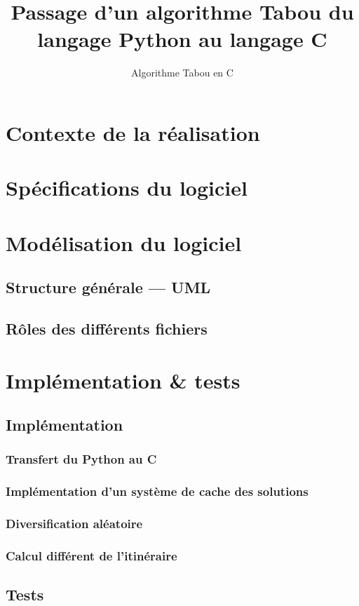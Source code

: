 \documentclass[hideweeklyreports]{polytech/polytech}
\title{Passage d'un algorithme Tabou du langage Python au langage C}
\subtitle{Algorithme Tabou en C}
\begin{document}
	\chapter{Contexte de la réalisation}
		
	\chapter{Spécifications du logiciel}
		
	\chapter{Modélisation du logiciel}
		\section{Structure générale — UML} %
		\section{Rôles des différents fichiers} %
		
	\chapter{Implémentation \& tests} %
		\section{Implémentation} %
			\subsection{Transfert du Python au C} %
			\subsection{Implémentation d'un système de cache des solutions} %
			\subsection{Diversification aléatoire} %
			\subsection{Calcul différent de l'itinéraire} %
		\section{Tests} %
		
\end{document}
